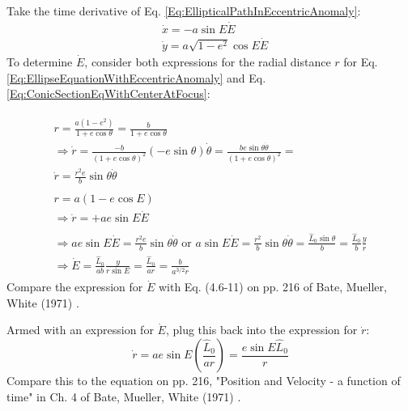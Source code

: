 \documentclass[10pt]{amsart}
\begin{document}
\begin{multicols*}{2}
Take the time derivative of Eq. \ref{Eq:EllipticalPathInEccentricAnomaly}:
\begin{equation}
\begin{aligned}
& \dot{x} = -a \sin{E} \dot{E} \\ 
& \dot{y} = a\sqrt{1 - e^2} \cos{E} \dot{E} 
\end{aligned} 
\end{equation}
To determine $\dot{E}$, consider both expressions for the radial distance $r$ for Eq. \ref{Eq:EllipseEquationWithEccentricAnomaly} and Eq. \ref{Eq:ConicSectionEqWithCenterAtFocus}:

\[
\begin{gathered} 
\begin{gathered} 
	r = \frac{a (1-e^2) }{ 1 + e\cos{\theta}} = \frac{b}{ 1 + e\cos{\theta}} \\
	\Longrightarrow \dot{r} = \frac{ -b}{ (1+e\cos{\theta})^2} (-e\sin{\theta})\dot{\theta} = \frac{ be \sin{\theta} \dot{\theta} }{ (1+ e\cos{\theta})^2 } = \\
		\dot{r} = \frac{r^2 e}{b} \sin{\theta} \dot{\theta}
\end{gathered} \\ 
\begin{gathered}
r = a(1 - e\cos{E}) \\
\Longrightarrow \dot{r}  = +ae\sin{E} \dot{E} 
\end{gathered} \\
\begin{gathered}
\Longrightarrow ae \sin{E} \dot{E} = \frac{r^2 e}{b} \sin{\theta} \dot{\theta} \text{ or } a\sin{E} \dot{E} = \frac{r^2}{b} \sin{\theta} \dot{\theta} = \frac{ \widehat{L}_0 \sin{\theta} }{ b} = \frac{\widehat{L}_0 }{b} \frac{y}{r} \\
\Longrightarrow \dot{E} = \frac{ \widehat{L}_0 }{ab} \frac{y}{r\sin{E}} = \frac{\widehat{L}_0 } {ar} = \frac{ b}{ a^{3/2} r} 
\end{gathered}
\end{gathered} 
\]
Compare the expression for $\dot{E}$ with Eq. (4.6-11) on pp. 216 of Bate, Mueller, White (1971) \cite{BMW1971}.

Armed with an expression for $\dot{E}$, plug this back into the expression for $\dot{r}$:
\begin{equation}
\dot{r} = a e \sin{E} \left( \frac{ \widehat{L}_0 }{ ar} \right) = \frac{ e\sin{E} \widehat{L}_0 }{ r}
\end{equation}
Compare this to the equation on pp. 216, "Position and Velocity - a function of time" in Ch. 4 of Bate, Mueller, White (1971) \cite{BMW1971}. 


\end{multicols*}
\end{document}
